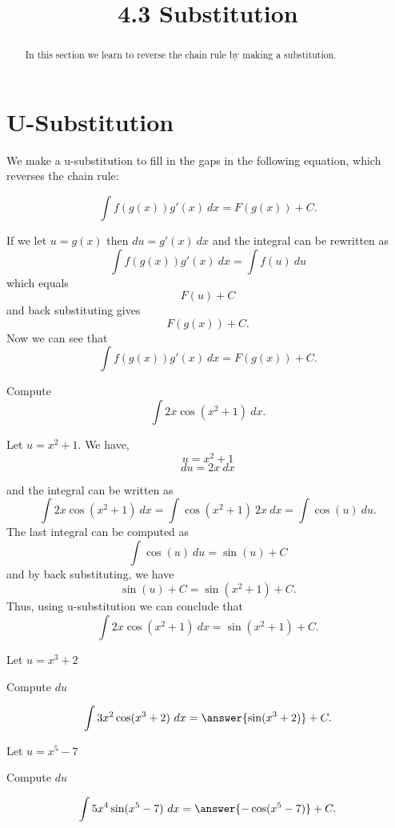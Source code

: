 \documentclass{ximera}
\title{4.3 Substitution}
\begin{document}
\begin{abstract}
In this section we learn to reverse the chain rule by making a substitution.
\end{abstract}

\maketitle

\section{U-Substitution}

We make a u-substitution to fill in the gaps in the following equation, which reverses the chain rule:

\[\int f(g(x))g'(x) \ dx = F(g(x)) + C. \]

If we let $ u = g(x)$ then $du = g'(x) \ dx$ and the integral can be rewritten as
\[\int f(g(x))g'(x) \ dx = \int f(u) \ du \]
which equals
\[F(u) + C\]
and back substituting gives
\[F(g(x)) + C. \]
Now we can see that
\[\int f(g(x))g'(x) \ dx = F(g(x)) + C. \]



\begin{example}
Compute 
\[\int 2x\cos(x^2 + 1) \ dx.\]

Let $u = x^2 + 1$.  We have,
\[u = x^2 + 1\]
\[du = 2x \ dx\]

and the integral can be written as 
\[\int 2x\cos(x^2 + 1) \ dx = \int \cos(x^2 + 1) \ 2x\  dx = \int \cos(u) \ du.\]
The last integral can be computed as 
\[\int \cos(u) \ du = \sin(u) + C\]
and by back substituting, we have 
\[\sin(u) + C = \sin(x^2 + 1) + C.\]
Thus, using u-substitution we can conclude that
\[\int 2x\cos(x^2 + 1) \ dx =  \sin(x^2 + 1) + C.\]
\end{example}

\begin{problem}
\begin{hint}
Let $u = x^3 + 2$
\end{hint}
\begin{hint}
Compute $du$
\end{hint}
\[\int 3x^2\cos(x^3 + 2) \ dx = \answer{\sin(x^3 + 2)} +C.\]
\end{problem}

\begin{problem}
\begin{hint}
Let $u = x^5 -7$
\end{hint}
\begin{hint}
Compute $du$
\end{hint}
\[\int 5x^4\sin(x^5 -7) \ dx = \answer{-\cos(x^5 -7)} +C.\]
\end{problem}
\end{document}
